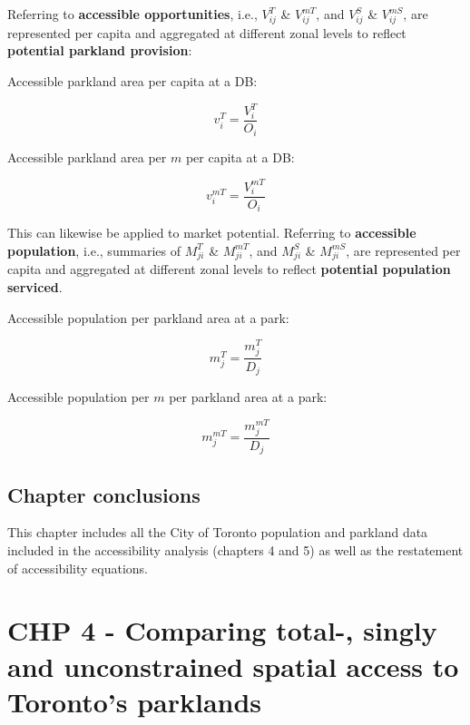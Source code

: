 \documentclass[
11pt, %
oneside, %
english, %
singlespacing, %
]{macthesis} %
\begin{document}
Referring to \textbf{accessible opportunities}, i.e., \(V_{ij}^T\) \& \(V_{ij}^{mT}\), and \(V_{ij}^{S}\) \& \(V_{ij}^{mS}\), are represented per capita and aggregated at different zonal levels to reflect \textbf{potential parkland provision}:

Accessible parkland area per capita at a DB:

\begin{equation}
\label{eq:total-constrained-access-per-capita}
v^{T}_{i} = \frac{V^{T}_{i}}{O_{i}}
\end{equation} 

Accessible parkland area per \(m\) per capita at a DB:

\begin{equation}
\label{eq:total-constrained-multimodal-access-per-capita}
v^{mT}_{i} = \frac{V^{mT}_{i}}{O_{i}}
\end{equation} 

This can likewise be applied to market potential. Referring to \textbf{accessible population}, i.e., summaries of \(M_{ji}^T\) \& \(M_{ji}^{mT}\), and \(M_{ji}^{S}\) \& \(M_{ji}^{mS}\), are represented per capita and aggregated at different zonal levels to reflect \textbf{potential population serviced}.

Accessible population per parkland area at a park:

\begin{equation}
\label{eq:total-constrained-market-per-capita}
m^{T}_{j} = \frac{m^{T}_{j}}{D_{j}}
\end{equation} 

Accessible population per \(m\) per parkland area at a park:

\begin{equation}
\label{eq:total-constrained-multimodal-market-per-capita}
m^{mT}_{j} = \frac{m^{mT}_{j}}{D_{j}}
\end{equation} 

\section{Chapter conclusions}\label{chapter-conclusions-1}

This chapter includes all the City of Toronto population and parkland data included in the accessibility analysis (chapters 4 and 5) as well as the restatement of accessibility equations.

\chapter{CHP 4 - Comparing total-, singly and unconstrained spatial access to Toronto's parklands}\label{chp-4---comparing-total--singly-and-unconstrained-spatial-access-to-torontos-parklands}
\end{document}
